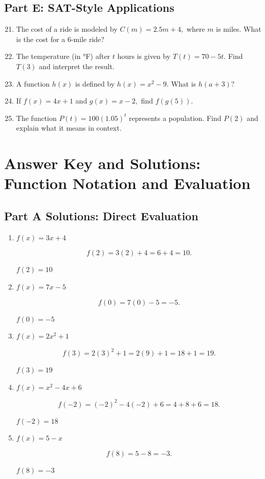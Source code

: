 \documentclass[14pt]{extarticle}
\begin{document}
\subsection*{Part E: SAT-Style Applications}
\begin{enumerate}
  \setcounter{enumi}{20}
  \item The cost of a ride is modeled by \(C(m) = 2.5m + 4,\) where \(m\) is miles.  
  What is the cost for a 6-mile ride?
  \item The temperature (in °F) after \(t\) hours is given by \(T(t) = 70 - 5t.\)  
  Find \(T(3)\) and interpret the result.
  \item A function \(h(x)\) is defined by \(h(x) = x^2 - 9.\)  
  What is \(h(a + 3)?\)
  \item If \(f(x) = 4x + 1\) and \(g(x) = x - 2,\) find \(f(g(5)).\)
  \item The function \(P(t) = 100(1.05)^t\) represents a population.  
  Find \(P(2)\) and explain what it means in context.
\end{enumerate}

\newpage


\section*{Answer Key and Solutions: Function Notation and Evaluation}

\subsection*{Part A Solutions: Direct Evaluation}
\begin{enumerate}
  \item \(f(x) = 3x + 4\)

  \[
  f(2) = 3(2) + 4 = 6 + 4 = 10.
  \]

  \(\boxed{f(2) = 10}\)

  \item \(f(x) = 7x - 5\)

  \[
  f(0) = 7(0) - 5 = -5.
  \]

  \(\boxed{f(0) = -5}\)

  \item \(f(x) = 2x^2 + 1\)

  \[
  f(3) = 2(3)^2 + 1 = 2(9) + 1 = 18 + 1 = 19.
  \]

  \(\boxed{f(3) = 19}\)

  \item \(f(x) = x^2 - 4x + 6\)

  \[
  f(-2) = (-2)^2 - 4(-2) + 6 = 4 + 8 + 6 = 18.
  \]

  \(\boxed{f(-2) = 18}\)

  \item \(f(x) = 5 - x\)

  \[
  f(8) = 5 - 8 = -3.
  \]

  \(\boxed{f(8) = -3}\)
\end{enumerate}
\end{document}
